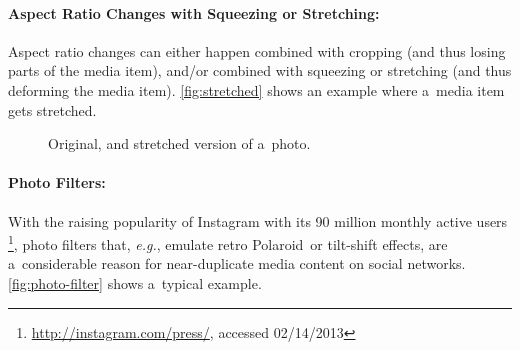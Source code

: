\paragraph{Aspect Ratio Changes with Squeezing or Stretching:}

Aspect ratio changes can either happen combined with cropping
(and thus losing parts of the media item), and/or combined with 
squeezing or stretching (and thus deforming the media item).
\autoref{fig:stretched} shows an example where a~media item gets stretched.

\begin{figure}[h!]
  \centering
  \caption{Original, and stretched version of a~photo.}
  \label{fig:bulged}  
\end{figure}

\paragraph{Photo Filters:}

With the raising popularity of Instagram with its 90 million monthly active users%
\footnote{\url{http://instagram.com/press/}, accessed 02/14/2013},
photo filters that, \emph{e.g.}, emulate retro Polaroid\texttrademark\ or tilt-shift effects,
are a~considerable reason for near-duplicate media content on social networks.
\autoref{fig:photo-filter} shows a~typical example.

